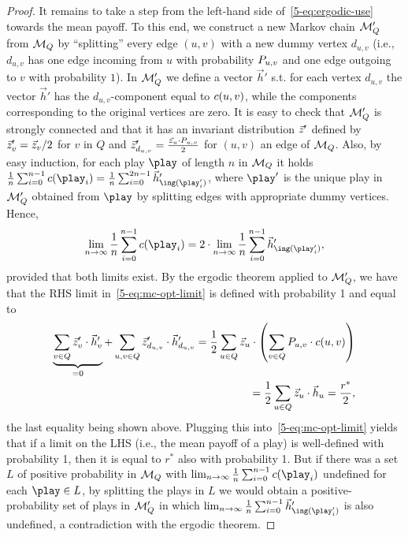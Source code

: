 \begin{proof}
It remains to take a step from the left-hand side of~\eqref{5-eq:ergodic-use} towards the mean payoff. To this end, we construct a new Markov chain $\mathcal{M}_Q'$ from $\mathcal{M}_Q$ by ``splitting'' every edge $(u,v)$ with a new dummy vertex $d_{u,v}$ (i.e., $d_{u,v}$ has one edge incoming from $u$ with probability $P_{u,v}$ and one edge outgoing to $v$ with probability $1$). In $\mathcal{M}_Q'$ we define a vector $\vec{h}'$ s.t. for each vertex $d_{u,v}$ the vector $ \vec{h}' $ has the $ d_{u,v} $-component equal to $c(u,v)$, while the components corresponding to the original vertices are zero. It is easy to check that $\mathcal{M}_Q'$  is strongly connected and that it has an invariant distribution $\vec{z}'$ defined by $\vec{z}'_v=\vec{z}_v/2$ for $v$ in $Q$ and $\vec{z}'_{d_{u,v}}=\frac{\vec{z}_u\cdot P_{u,v}}{2}$ for $(u,v)$ an edge of $\mathcal{M}_Q$.
Also, by easy induction, for each play $\play$ of length $n$ in $\mathcal{M}_Q$ it holds $\frac{1}{n}\sum_{i=0}^{n-1}\colouring(\play_i) = \frac{1}{n}\sum_{i=0}^{2n-1}\vec{h}'_{\ing(\play_i')}$, where $\play'$ is the unique play in $\mathcal{M}_Q'$ obtained from $\play$ by splitting edges with appropriate dummy vertices. Hence, 
\begin{equation}
\label{5-eq:mc-opt-limit}
\lim_{n\rightarrow \infty}\frac{1}{n}\sum_{i=0}^{n-1}\colouring(\play_i) = 2\cdot \lim_{n\rightarrow \infty}\frac{1}{n}\sum_{i=0}^{n-1}\vec{h}'_{\ing(\play_i')},\end{equation} provided that both limits exist. By the ergodic theorem  applied to $\mathcal{M}_Q'$, we have that the RHS  limit in~\eqref{5-eq:mc-opt-limit} is defined with probability 1 and equal to
\begin{align*}
\underbrace{\sum_{v\in Q} \vec{z}'_v \cdot \vec{h}'_{v}}_{=0} + \sum_{u,v\in Q} \vec{z}'_{d_{u,v}}\cdot \vec{h}'_{d_{u,v}} = \frac{1}{2}\sum_{u\in Q}\vec{z}_u\cdot\left( \sum_{v\in Q}P_{u,v}\cdot c(u,v)\right)\\ =\frac{1}{2}\sum_{u\in Q} \vec{z}_u\cdot \vec{h}_u=\frac{r^*}{2},
\end{align*}
\noindent
the last equality being shown above. Plugging this into~\eqref{5-eq:mc-opt-limit} yields that if a limit on the LHS (i.e., the mean payoff of a play) is well-defined with probability 1, then it is equal to $r^*$ also with probability 1. But if there was a set $L$ of positive probability in $\mathcal{M}_Q$ with $\lim_{n \rightarrow \infty}\frac{1}{n}\sum_{i=0}^{n-1}\colouring(\play_i)$ undefined for each $\play\in L$, by splitting the plays in $L$ we would obtain a positive-probability set of plays in $\mathcal{M}_Q'$ in which $\lim_{n \rightarrow \infty}\frac{1}{n}\sum_{i=0}^{n-1}\vec{h}'_{\ing(\play_i')}$ is also undefined, a contradiction with the ergodic theorem. 

\end{proof}
